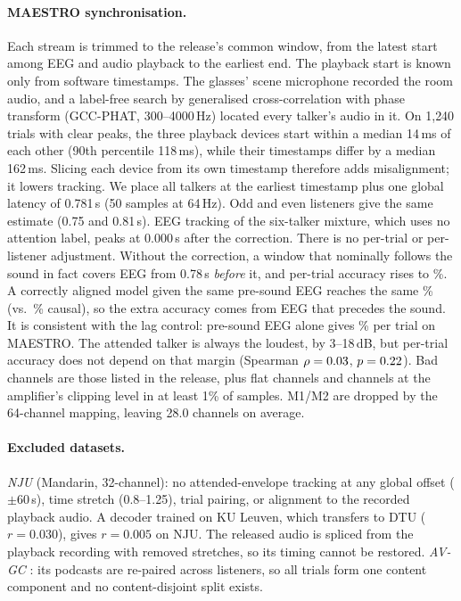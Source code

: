 \documentclass[10pt,twocolumn,letterpaper]{article}
\begin{document}
\paragraph{MAESTRO synchronisation.} Each stream is trimmed to the release's common window,
from the latest start among EEG and audio playback to the earliest end. The playback start is
known only from software timestamps. The glasses' scene microphone recorded the room audio,
and a label-free search by generalised cross-correlation with phase transform (GCC-PHAT,
300--4000\,Hz) located every talker's audio in it. On 1{,}240
trials with clear peaks, the three playback devices start within a median 14\,ms of each
other (90th percentile 118\,ms), while their timestamps differ by a median 162\,ms. Slicing
each device from its own timestamp therefore adds misalignment; it lowers tracking. We place
all talkers at the earliest timestamp plus one global latency of 0.781\,s (50 samples at
64\,Hz). Odd and even listeners give the same estimate (0.75 and 0.81\,s). EEG tracking of
the six-talker mixture, which uses no attention label, peaks at 0.000\,s after the
correction. There is no per-trial or per-listener adjustment. Without the correction, a window
that nominally follows the sound in fact covers EEG from 0.78\,s \emph{before} it, and
per-trial accuracy rises to \maePkgTrial\%. A correctly aligned model given the same pre-sound
EEG reaches the same \maePreTrial\% (vs.\ \maeCompTrial\% causal), so the extra accuracy comes
from EEG that precedes the sound. It is consistent with the lag control: pre-sound EEG alone
gives \maBeforeTrial\% per trial on MAESTRO. The attended talker is always the loudest, by
3--18\,dB, but per-trial accuracy does not depend on that margin (Spearman
$\rho=0.03$, $p=0.22$). Bad channels are those listed
in the release, plus flat channels and channels at the amplifier's clipping level in at
least 1\% of samples. M1/M2 are dropped by the 64-channel mapping, leaving 28.0 channels on
average.

\paragraph{Excluded datasets.}
\emph{NJU} \citep{zhang2023learnable} (Mandarin, 32-channel): no attended-envelope tracking at any global offset
($\pm60$\,s), time stretch (0.8--1.25), trial pairing, or alignment to the recorded
playback audio. A decoder trained on KU Leuven, which transfers to DTU ($r=0.030$), gives
$r=0.005$ on NJU. The released audio is spliced from the playback recording with removed
stretches, so its timing cannot be restored.
\emph{AV-GC} \citep{rotaru2024what}: its podcasts are re-paired across listeners, so all
trials form one content component and no content-disjoint split exists.
\end{document}
